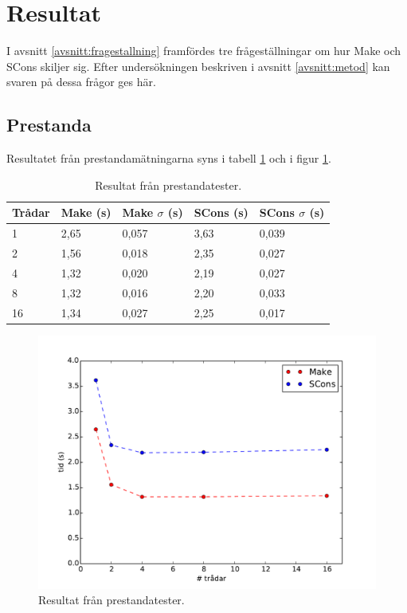 \section{Resultat}
I avsnitt \ref{avsnitt:fragestallning} framfördes tre frågeställningar om hur Make och SCons skiljer sig. Efter undersökningen beskriven i avsnitt \ref{avsnitt:metod} kan svaren på dessa frågor ges här.

\subsection{Prestanda}
Resultatet från prestandamätningarna syns i tabell \ref{tabell:prestanda} och i figur \ref{fig:prestanda}.

\begin{table}[h!]
  \centering
  \begin{tabular}{|l|l|l|l|l|}
    \hline
    \textbf{Trådar} & \textbf{Make} (s) & \textbf{Make $\sigma$} (s) & \textbf{SCons} (s) & \textbf{SCons $\sigma$} (s) \\ \hline
    1 & 2,65 & 0,057 & 3,63 & 0,039 \\ \hline
    2 & 1,56 & 0,018 & 2,35 & 0,027 \\ \hline
    4 & 1,32 & 0,020 & 2,19 & 0,027 \\ \hline
    8 & 1,32 & 0,016 & 2,20 & 0,033 \\ \hline
    16 & 1,34 & 0,027 & 2,25 & 0,017 \\ \hline
  \end{tabular}
  \caption{Resultat från prestandatester.}
  \label{tabell:prestanda}
\end{table}

\begin{figure}[h!]
  \centering
  \includegraphics[scale=0.6]{yngve-tex/grafik/prestanda.pdf}
  \caption{Resultat från prestandatester.}
  \label{fig:prestanda}
\end{figure}

